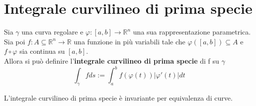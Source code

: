 \section{Integrale curvilineo di prima specie}
\begin{definition}
    Sia $\gamma$ una curva regolare e $\varphi:[a,b]\to \mathbb{R}^n$ una sua rappresentazione parametrica. Sia poi $f:A\subseteq \mathbb{R}^n \to \mathbb{R}$ una funzione in più variabili tale che $\varphi([a,b])\subseteq A$ e $f \circ\varphi$ sia continua su $[a,b]$.\\
    Allora si può definire l'\textbf{integrale curvilineo di prima specie} di f su $\gamma$
    \begin{equation}
        \int_\gamma{fds} := \int_{a}^{b}{f(\varphi(t))|\varphi'(t)|dt}
    \end{equation}
\end{definition}
\begin{theorem}
    L'integrale curvilineo di prima specie è invariante per equivalenza di curve.
\end{theorem}
